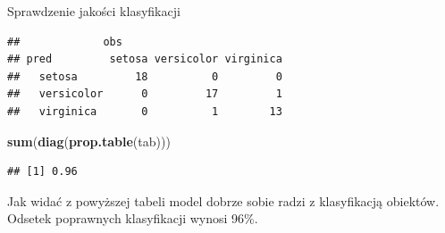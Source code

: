 \documentclass[
]{book}
\newenvironment{Shaded}{\begin{snugshade}}{\end{snugshade}}
\newcommand{\AttributeTok}[1]{\textcolor[rgb]{0.13,0.29,0.53}{#1}}
\newcommand{\DecValTok}[1]{\textcolor[rgb]{0.00,0.00,0.81}{#1}}
\newcommand{\FunctionTok}[1]{\textcolor[rgb]{0.13,0.29,0.53}{\textbf{#1}}}
\newcommand{\NormalTok}[1]{#1}
\newcommand{\OtherTok}[1]{\textcolor[rgb]{0.56,0.35,0.01}{#1}}
\newcommand{\SpecialCharTok}[1]{\textcolor[rgb]{0.81,0.36,0.00}{\textbf{#1}}}
\theoremstyle{plain}
\theoremstyle{definition}
\theoremstyle{definition}
\theoremstyle{definition}
\theoremstyle{definition}
\theoremstyle{definition}
\theoremstyle{remark}
\begin{document}
Sprawdzenie jakości klasyfikacji

\begin{Shaded}
\end{Shaded}

\begin{verbatim}
##             obs
## pred         setosa versicolor virginica
##   setosa         18          0         0
##   versicolor      0         17         1
##   virginica       0          1        13
\end{verbatim}

\begin{Shaded}
\begin{Highlighting}[]
\FunctionTok{sum}\NormalTok{(}\FunctionTok{diag}\NormalTok{(}\FunctionTok{prop.table}\NormalTok{(tab)))}
\end{Highlighting}
\end{Shaded}

\begin{verbatim}
## [1] 0.96
\end{verbatim}

Jak widać z powyższej tabeli model dobrze sobie radzi z klasyfikacją obiektów. Odsetek poprawnych klasyfikacji wynosi 96\%.

\begin{Shaded}
\end{Shaded}
\end{document}
